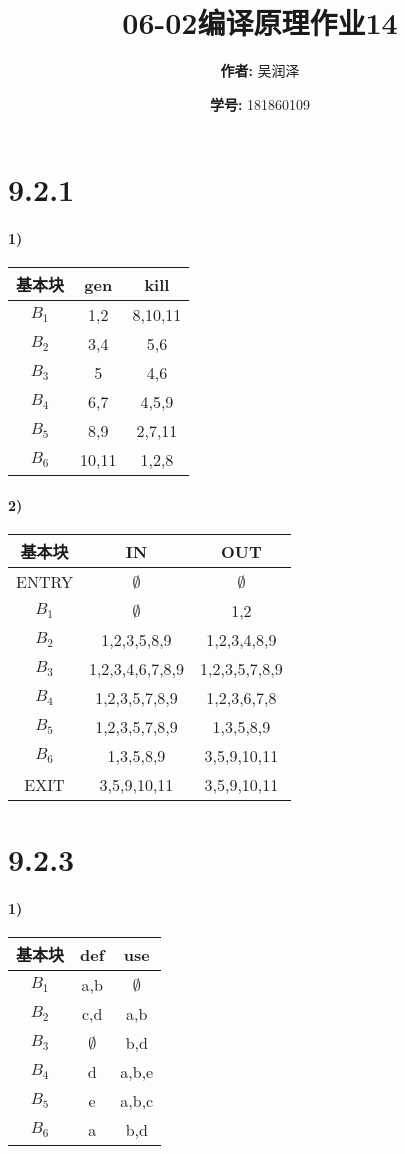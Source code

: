 \documentclass[11pt]{article}
\title{06-02编译原理作业14}
\author{
			\textbf{作者:} {吴润泽}
			\and {\textbf{学号:} 181860109}
		}
\begin{document}
\maketitle
\section*{9.2.1}
\paragraph{1)}
\begin{tabular}{|c|c|c|}
	\hline
	\textbf{基本块} & \textbf{gen} & \textbf{kill} \\ \hline
	$B_1$ & 1,2 & 8,10,11 \\ \hline
	$B_2$ & 3,4 & 5,6 \\ \hline
	$B_3$ & 5 & 4,6 \\ \hline
	$B_4$ & 6,7 & 4,5,9 \\ \hline
	$B_5$ & 8,9 & 2,7,11 \\ \hline
	$B_6$ & 10,11 & 1,2,8 \\ \hline
\end{tabular}
\paragraph{2)}
\begin{tabular}{|c|c|c|}
	\hline
	\textbf{基本块} & \textbf{IN} & \textbf{OUT} \\ \hline
	ENTRY & $\emptyset$ & $\emptyset$ \\ \hline
	$B_1$ & $\emptyset$ & 1,2 \\ \hline
	$B_2$ & 1,2,3,5,8,9 & 1,2,3,4,8,9 \\ \hline
	$B_3$ & 1,2,3,4,6,7,8,9 & 1,2,3,5,7,8,9 \\ \hline
	$B_4$ & 1,2,3,5,7,8,9 & 1,2,3,6,7,8 \\ \hline
	$B_5$ & 1,2,3,5,7,8,9 & 1,3,5,8,9 \\ \hline
	$B_6$ & 1,3,5,8,9 & 3,5,9,10,11 \\ \hline
	EXIT  & 3,5,9,10,11 & 3,5,9,10,11 \\ \hline
\end{tabular}
\section*{9.2.3}
\paragraph{1)}
\begin{tabular}{|c|c|c|}
	\hline
	\textbf{基本块} & \textbf{def} & \textbf{use} \\ \hline
	$B_1$ & a,b & $\emptyset$ \\ \hline
	$B_2$ & c,d & a,b \\ \hline
	$B_3$ & $\emptyset$ & b,d \\ \hline
	$B_4$ & d & a,b,e \\ \hline
	$B_5$ & e & a,b,c \\ \hline
	$B_6$ & a & b,d \\ \hline
\end{tabular}
\end{document}

